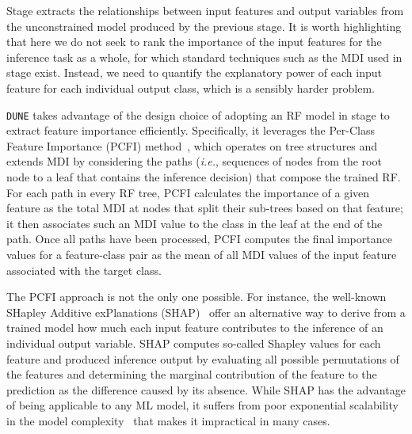 \documentclass[journal]{IEEEtran}
\theoremstyle{plain} %
\newcommand{\eg}{\textit{e.g.},\xspace}
\newcommand{\ie}{\textit{i.e.},\xspace}
\newcommand{\mf}[1]{\textcolor{teal}{[Marco: #1]}}
\newcommand*\numO[1]{\raisebox{.5pt}{\textcircled{\raisebox{-.9pt} {#1}}}}
\newcommand{\var}[1]{\texttt{\small{#1}}}
\newcommand{\name}{\texttt{\fontsize{9}{11}\selectfont DUNE}\xspace}
\begin{document}

Stage \numO{2} extracts the relationships between input features and output variables from the unconstrained model produced by the previous stage. It is worth highlighting that here we do not seek to rank the importance of the input features for the inference task as a whole, for which standard techniques such as the MDI used in stage \numO{1} exist. Instead, we need to quantify the explanatory power of each input feature for each individual output class, which is a sensibly harder problem.

\name takes advantage of the design choice of adopting an RF model in stage \numO{1} to extract feature importance efficiently. Specifically, it leverages the Per-Class Feature Importance (PCFI) method~\cite{Cramer_Per-Class_Feature_Importance_2020}, which operates on tree structures and extends MDI by considering the paths (\ie sequences of nodes from the root node to a leaf that contains the inference decision) that compose the trained RF. For each path in every RF tree, PCFI calculates the importance of a given feature as the total MDI at nodes that split their sub-trees based on that feature; it then associates such an MDI value to the class in the leaf at the end of the path. Once all paths have been processed, PCFI computes the final importance values for a feature-class pair as the mean of all MDI values of the input feature associated with the target class.

The PCFI approach is not the only one possible. For instance, the well-known SHapley Additive exPlanations (SHAP)~\cite{NIPS2017_8a20a862} offer an alternative way to derive from a trained model how much each input feature contributes to the inference of an individual output variable. SHAP computes so-called Shapley values for each feature and produced inference output by evaluating all possible permutations of the features and determining the marginal contribution of the feature to the prediction as the difference caused by its absence.
While SHAP has the advantage of being applicable to any ML model, it suffers from poor exponential scalability in the model complexity~\cite{arora2009computational} that makes it impractical in many cases.
\end{document}
